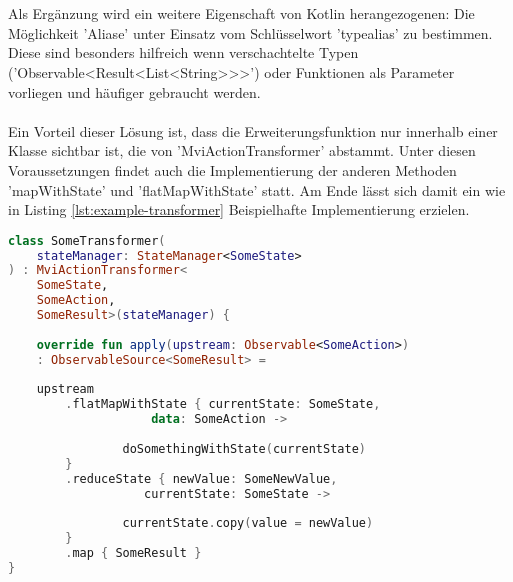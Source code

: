 \\\\
Als Ergänzung wird ein weitere Eigenschaft von Kotlin herangezogenen: Die Möglichkeit 'Aliase' unter Einsatz vom Schlüsselwort 'typealias' zu bestimmen. Diese sind besonders hilfreich wenn verschachtelte Typen ('Observable<Result<List<String>>>') oder Funktionen als Parameter vorliegen und häufiger gebraucht werden.
\\\\
Ein Vorteil dieser Lösung ist, dass die Erweiterungsfunktion nur innerhalb einer Klasse sichtbar ist, die von 'MviActionTransformer' abstammt. Unter diesen Voraussetzungen findet auch die Implementierung der anderen Methoden 'mapWithState' und 'flatMapWithState' statt. Am Ende lässt sich damit ein wie in Listing
\ref{lst:example-transformer}
Beispielhafte Implementierung erzielen. 
\begin{lstlisting}[caption={Beispiel Implementation}, label={lst:example-transformer},language=Kotlin]
class SomeTransformer(
	stateManager: StateManager<SomeState>
) : MviActionTransformer<
	SomeState,
	SomeAction,
	SomeResult>(stateManager) {
	
	override fun apply(upstream: Observable<SomeAction>)
	: ObservableSource<SomeResult> =
	
	upstream
		.flatMapWithState { currentState: SomeState,
					data: SomeAction ->
		
				doSomethingWithState(currentState)
		}
		.reduceState { newValue: SomeNewValue,
				   currentState: SomeState ->
		
				currentState.copy(value = newValue)
		}
		.map { SomeResult }
}
\end{lstlisting}

